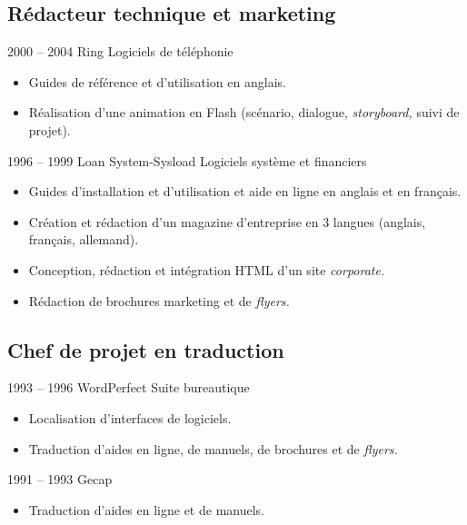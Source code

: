 \documentclass[12pt,a4paper,roman]{moderncv}
\begin{document}
\subsection{Rédacteur technique et marketing}

\cventry
    {2000 – 2004}
    {Ring}
    {Logiciels de téléphonie}
    {}
    {}
    {
      \begin{itemize}
      \item Guides de référence et d'utilisation en anglais.
      \item Réalisation d'une animation en Flash (scénario, dialogue,
        \emph{storyboard,} suivi de projet).
    \end{itemize}}


\cventry
    {1996 – 1999}
    {Loan System-Sysload}
    {Logiciels système et financiers}
    {}
    {}
    {
      \begin{itemize}
      \item Guides d'installation et d'utilisation et aide en ligne en anglais
        et en français.
      \item Création et rédaction d'un magazine d'entreprise en 3 langues
        (anglais, français, allemand).
      \item Conception, rédaction et intégration HTML d'un site
        \emph{corporate.}
      \item Rédaction de brochures marketing et de \emph{flyers.}
      \end{itemize}
    }


\subsection{Chef de projet en traduction}

\cventry
    {1993 – 1996}
    {WordPerfect}
    {Suite bureautique}
    {}
    {}
    {
      \begin{itemize}
      \item Localisation d'interfaces de logiciels.
      \item Traduction d'aides en ligne, de manuels, de brochures et de
        \emph{flyers.}
      \end{itemize}
    }


\cventry
    {1991 – 1993}
    {Gecap}
    {}
    {}
    {}
    {
      \begin{itemize}
      \item Traduction d'aides en ligne et de manuels.
      \end{itemize}
    }
\end{document}
